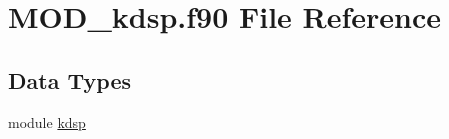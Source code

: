 \hypertarget{MOD__kdsp_8f90}{\section{M\-O\-D\-\_\-kdsp.\-f90 File Reference}
\label{MOD__kdsp_8f90}
}
\subsection*{Data Types}
\begin{DoxyCompactItemize}
\item 
module \hyperlink{classkdsp}{kdsp}
\end{DoxyCompactItemize}
